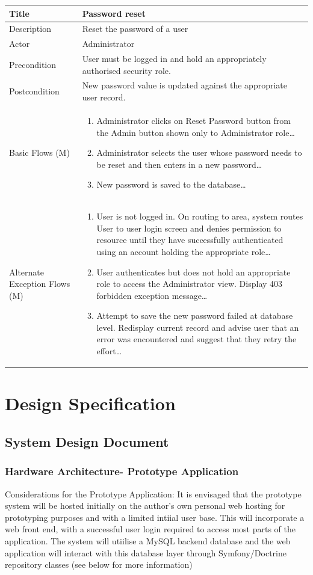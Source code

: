 \documentclass[a4paper,12pt]{article}
\newcommand\addrow[2]{#1 &#2\\ }
\newcommand\addheading[2]{#1 &#2\\ \hline}
\newcommand\tabularhead{\begin{tabular}{lp{11cm}}
\hline
}
\newcommand\addmulrow[2]{ \begin{minipage}[t][][t]{3cm}#1\end{minipage}%
   &\begin{minipage}[t][][t]{11cm}
    \begin{enumerate} #2   \end{enumerate}
    \end{minipage}\\ }
\newenvironment{usecase}{\tabularhead}
{\hline\end{tabular}}
\begin{document}
\begin{samepage}
\begin{usecase}
   \addheading{Title}{Password reset}
  \addheading{Description}{Reset the password of a user}
  \addheading{Actor}{Administrator} 
  \addrow{Precondition}{User must be logged in and hold an appropriately authorised security role.}
  \addrow{Postcondition}{New password value is updated against the appropriate user record.}
  \addmulrow{Basic Flows (M)}{\item Administrator clicks on Reset Password button from the Admin button shown only to Administrator role\ldots
  \newpage
  \item Administrator selects the user whose password needs to be reset and then enters in a new password\ldots
  \item New password is saved to the database\ldots}
  \addmulrow{Alternate Exception Flows (M)}{\item User is not logged in. On routing to area, system routes User to user login screen and denies permission to resource until they have successfully authenticated using an account holding the appropriate role\ldots
                                                                      \item User authenticates but does not hold an appropriate role to access the Administrator  view. Display 403 forbidden exception message\ldots
                                                                      \item Attempt to save the new password failed at database level. Redisplay current record and advise user that an error was encountered and suggest that they retry the effort\ldots}
\end{usecase}

\end{samepage}
\newpage
\section{Design Specification}
\subsection {System Design Document}
\subsubsection{Hardware Architecture- Prototype Application}

Considerations for the Prototype Application: It is envisaged that the prototype system will be hosted initially on the author's own personal web hosting for prototyping purposes and with a limited intiial user base. This will incorporate a web front end, with a successful user login required to access most parts of the application. The system will utiilise a MySQL backend database and the web application will interact with this database layer through Symfony/Doctrine repository classes (see below for more information)
\end{document}
